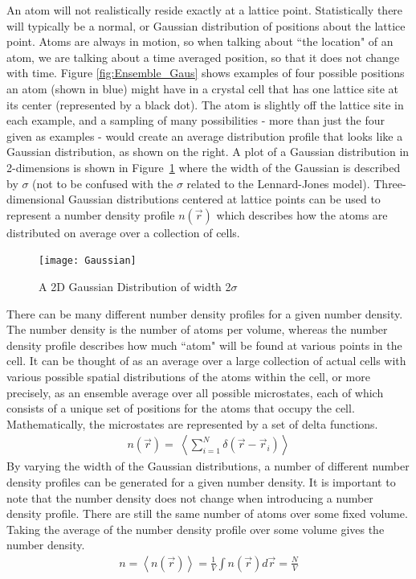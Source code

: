 \documentclass[double,12pt]{beavtex}
\begin{document}
An atom will not realistically reside exactly at a lattice point. 
Statistically there will typically be a normal, or Gaussian distribution 
of positions about the lattice point. 
Atoms are always in motion, so when talking about ``the location" 
of an atom, we are talking about a time averaged position, so that it 
does not change with time.
Figure \ref{fig:Ensemble_Gaus} shows examples 
of four possible positions an atom (shown in blue) might have in a crystal 
cell that has one lattice site at its center (represented by a black dot). 
The atom is slightly off the lattice site in each example, and 
a sampling of many possibilities - more than just the four given 
as examples - would create an average distribution profile that looks 
like a Gaussian distribution, as shown on the right.
A plot of a Gaussian distribution in 2-dimensions is shown in 
Figure~\ref{fig:Gaus_plot} where the width of the Gaussian is described 
by $\sigma$ (not to be confused with the $\sigma$ related to the 
Lennard-Jones model). 
Three-dimensional Gaussian distributions centered at lattice points can be 
used to represent a number density profile $n(\vec{r})$  which describes 
how the atoms are distributed on average over a collection of cells. 

\begin{figure}
  \centering
  \texttt{[image: Gaussian]}
  \caption{A 2D Gaussian Distribution of width 2$\sigma$}
  \label{fig:Gaus_plot}
\end{figure}  
  
There can be many different number density profiles for a given number
density. The number density is the number of atoms per volume, whereas
the number density profile describes how much ``atom" will be found at various 
points in the cell. 
It can be thought of as an average over a large collection of actual cells
with various possible spatial distributions of the atoms within the cell, or
more precisely, as an ensemble average over all possible microstates, 
each of which consists of a unique set of positions for the atoms 
that occupy the cell. Mathematically, the microstates are represented 
by a set of delta functions.
\begin{align}
    n(\vec r)=~\left<\sum_{i=1}^N\delta(\vec r - \vec r_i)\right>
\end{align} 
By varying the width of the Gaussian distributions, a number of different 
number density profiles can be generated for a given number density.
It is important to note that the number density does not change when 
introducing a number density profile.  
There are still the same number of atoms over some fixed volume. 
Taking the average of the number density profile over some volume 
gives the number density. 
\begin{align}
    n=\left<n(\vec{r})\right>=\frac{1}{V}\int{n(\vec{r})}{d\vec{r}}=\frac{N}{V}
\end{align}
\end{document}
